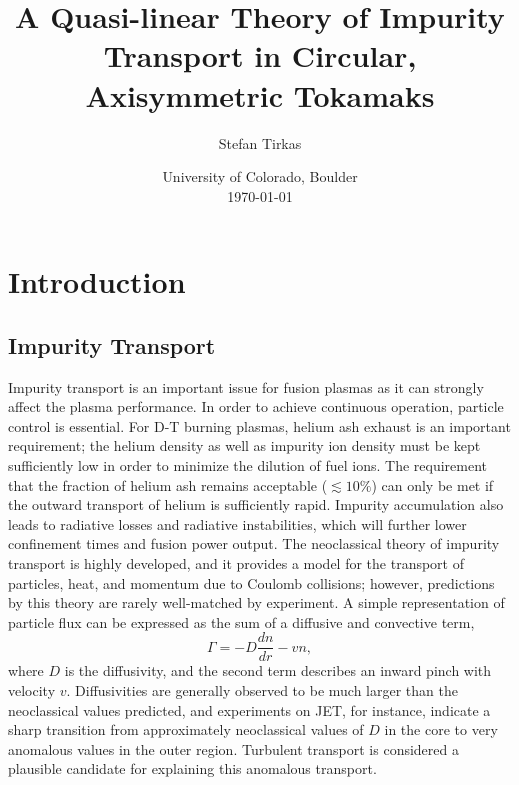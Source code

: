 \documentclass[12pt]{article}
\numberwithin{equation}{subsection}
\begin{document}
\title{A Quasi-linear Theory of Impurity Transport in Circular, Axisymmetric Tokamaks}
\author{Stefan Tirkas}


\date{University of Colorado, Boulder\\[2ex]%
      \today}

\maketitle


\section{Introduction}

\subsection{Impurity Transport}
   \quad Impurity transport is an important issue for fusion plasmas as it can strongly affect the plasma performance.
In order to achieve continuous operation, particle control is essential\cite{ITER}. For D-T burning plasmas, helium ash exhaust is
an important requirement; the helium density as well as impurity ion density must be kept sufficiently low in order to
minimize the dilution of fuel ions. The requirement that the fraction of helium ash remains acceptable ($\lesssim 10\%$) can
only be met if the outward transport of helium is sufficiently rapid\cite{WessonA}. Impurity accumulation also leads to radiative
losses and radiative instabilities, which will further lower confinement times and fusion power output. The neoclassical theory of
impurity transport is highly developed, and it provides a model for the transport of particles, heat, and momentum due to Coulomb
collisions; however, predictions by this theory are rarely well-matched by experiment. A simple representation of particle flux can
be expressed as the sum of a diffusive and convective term,
   \begin{equation}
      \Gamma = -D\frac{dn}{dr} - vn,
   \end{equation}
where $D$ is the diffusivity, and the second term describes an inward pinch with velocity $v$. Diffusivities are generally observed
to be much larger than the neoclassical values predicted, and experiments on JET, for instance, indicate a sharp transition from
approximately neoclassical values of $D$ in the core to very anomalous values in the outer region\cite{WessonB}. Turbulent transport
is considered a plausible candidate for explaining this anomalous transport.
\end{document}
